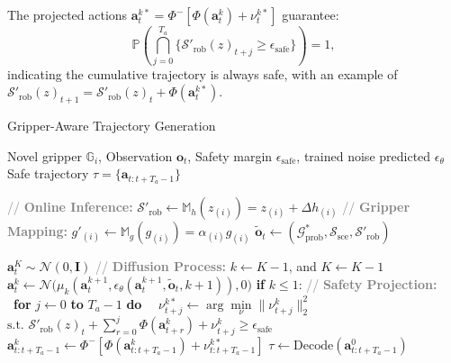 The projected actions $\mathbf{a}^{k*}_t = \Phi^{-}[\Phi(\mathbf{a}^{k}_t) + \nu^{k*}_t]$ guarantee:
\begin{equation}
\mathbb{P}\left(\bigcap_{j=0}^{T_a} \{\mathcal{S}'_{\text{rob}}(z)_{t+j} \geq \epsilon_{\text{safe}}\}\right) = 1,
\end{equation} 
indicating the cumulative trajectory is always safe, with an example of $\mathcal{S}'_{\text{rob}}(z)_{t+1}=\mathcal{S}'_{\text{rob}}(z)_t+\Phi(\mathbf{a}^{k*}_t)$.


\begin{algorithm}[!t]
    \caption{Gripper-Aware Trajectory Generation}\label{alg:safe_diffusion}
    \begin{algorithmic}[1]
    
        \Require Novel gripper $\mathbb{G}_i$, Observation $\mathbf{o}_t$, Safety margin $\epsilon_{\text{safe}}$, trained noise predicted $\epsilon_\theta$
        \Ensure Safe trajectory $\tau = \{\mathbf{a}_{t:t+T_a-1}\}$
        
        \noindent \textcolor{gray}{// \textbf{Online Inference:}}
        \State $\mathcal{S}'_{\text{rob}} \leftarrow \mathds{M}_h(z_{(i)}) = z_{(i)} + \Delta h_{(i)}$ \textcolor{gray}{// \textbf{Gripper Mapping:}}
        \State $g'_{(i)} \leftarrow \mathds{M}_g(g_{(i)}) = \alpha_{(i)} g_{(i)}$
        \State $\mathbf{\tilde{o}}_t \leftarrow (\mathcal{G}^*_{\text{prob}}, \mathcal{S}^{ }_{\text{sce}}, \mathcal{S}'_{\text{rob}})$
    
        \State $\mathbf{a}^{K}_t \sim \mathcal{N}(0, \mathbf{I})$ \textcolor{gray}{// \textbf{Diffusion Process:}}
        \Repeat
            \State $k \leftarrow K-1$, and $K \leftarrow K-1$
            \State $\mathbf{a}^{k}_t \leftarrow \mathcal{N}\big(\mu_{k}(\mathbf{a}^{k+1}_{t}, \epsilon_{\theta}(\mathbf{a}^{k+1}_{t},\mathbf{\tilde{o}}_t,k+1)), 0\big)$
            \State \textbf{if} $k \leq 1$: \textcolor{gray}{// \textbf{Safety Projection:}}
            \State\quad\ \textbf{for} $j \leftarrow 0$ \textbf{to} $T_a-1$ \textbf{do}
            \State\quad\quad\ \ $\nu^{k*}_{t+j} \leftarrow \arg\min\limits_{\nu} \|\nu^k_{t+j}\|^2_2$
            \State\quad\quad\ \ $\text{s.t. } \mathcal{S}'_{\text{rob}}(z)_{t}+\sum\limits_{r=0}^{j}\Phi(\mathbf{a}^{k}_{t+r}) + \nu^k_{t+j} \geq \epsilon_{\text{safe}}$
            \State\quad\ $\mathbf{a}^{k}_{t:t+T_a-1} \leftarrow \Phi^{-}[\Phi(\mathbf{a}^{k}_{t:t+T_a-1}) + \nu^{k*}_{t:t+T_a-1}]$
        \State $\tau \leftarrow \text{Decode}(\mathbf{a}^{0}_{t:t+T_a-1})$
    \end{algorithmic}
\end{algorithm} 
